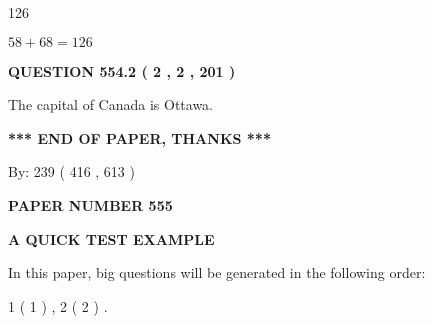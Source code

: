 \documentclass[12pt]{article}
\begin{document}
126
 
 
 
 
\noindent{}

$ %
58 +  %
68=   %
126$
 
 
  
\vspace{0.2in}
  
{\textbf{\Large{QUESTION
554.2 
 ( 2 , 2 , 201 )
}}}
  
  
 
 
\noindent{}
 
 
The capital of Canada is Ottawa.
 
 
 
 
   
   
 \vspace{0.2in}
 
   
   
   
   
\vspace{1.0in} 
{\textbf{\large{ *** END OF PAPER, THANKS *** }}} 
   
   
\hspace{1.0in} By: 
 239 ( 416 ,  613 )
   
   
   
   
\newpage 
\setcounter{page}{ 
   555001 } 
   
   
   
   
 {\textbf{ \Large{ PAPER NUMBER  555  }}}
   
   
\vspace{0.2in}
   
   
   
   
   
   
 \vspace{0.2in}
{\LARGE {\textbf{ A QUICK TEST EXAMPLE}}}
   
   
   
\vspace{0.2in}
   
In this paper, big questions will be generated in the following order: 
   
   
   1 ( 1 )
 ,
   2 ( 2 )
 .
  
\vspace{0.2in}
  
\end{document}
